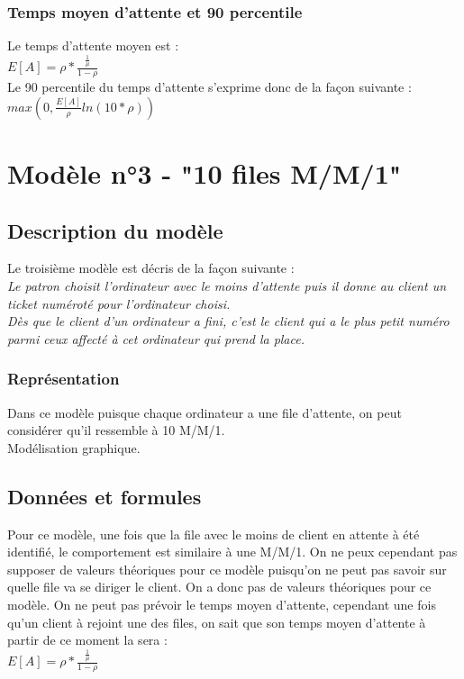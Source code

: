 \documentclass[a4paper,11pt]{article}
\begin{document}
		\subsubsection{Temps moyen d'attente et 90 percentile}
		Le temps d'attente moyen est :\\
		$E[A] = \rho * \frac{\frac{1}{\mu}}{1-\rho}$
		\\
		Le 90 percentile du temps d'attente s'exprime donc de la façon suivante :\\
		$max(0,\frac{E[A]}{\rho}ln(10*\rho))$
		

\section{Modèle n°3 - "10 files M/M/1"}
	\subsection{Description du modèle}
	Le troisième modèle est décris de la façon suivante :\\
	\textit{Le patron choisit l'ordinateur avec le moins d'attente puis il donne au client un ticket numéroté pour l'ordinateur choisi.\\
			Dès que le client d'un ordinateur a fini, c'est le client qui a le plus petit numéro parmi ceux affecté à cet ordinateur qui prend la place.}
	\subsubsection{Représentation}
		Dans ce modèle puisque chaque ordinateur a une file d'attente, on peut considérer qu'il ressemble à 10 M/M/1.\\

	Modélisation graphique.\\
	
	\subsection{Données et formules}
	Pour ce modèle, une fois que la file avec le moins de client en attente à été identifié, le comportement est similaire à une M/M/1. On ne peux cependant pas supposer de valeurs théoriques pour ce modèle puisqu'on ne peut pas savoir sur quelle file va se diriger le client. On a donc pas de valeurs théoriques pour ce modèle.
	On ne peut pas prévoir le temps moyen d'attente, cependant une fois qu'un client à rejoint une des files, on sait que son temps moyen d'attente à partir de ce moment la sera : \\
	$E[A] = \rho * \frac{\frac{1}{\mu}}{1-\rho}$
	\\
\end{document}

